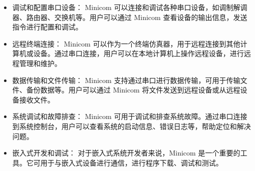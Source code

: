\begin{itemize}
	\item 调试和配置串口设备： Minicom 可以连接和调试各种串口设备，如调制解调器、路由器、交换机等。用户可以通过 Minicom 查看设备的输出信息，发送指令进行配置和调试。

	\item 远程终端连接： Minicom 可以作为一个终端仿真器，用于远程连接到其他计算机或设备。通过串口连接，用户可以在本地计算机上操作远程设备，进行远程管理和维护。

	\item 数据传输和文件传输： Minicom 支持通过串口进行数据传输，可用于传输文件、备份数据等。用户可以通过 Minicom 将文件发送到远程设备或从远程设备接收文件。

	\item 系统调试和故障排查： Minicom 可用于调试和排查系统故障。通过串口连接到系统控制台，用户可以查看系统的启动信息、错误日志等，帮助定位和解决问题。

	\item 嵌入式开发和调试： 对于嵌入式系统开发者来说，Minicom 是一个重要的工具。它可用于与嵌入式设备进行通信，进行程序下载、调试和测试。
\end{itemize}